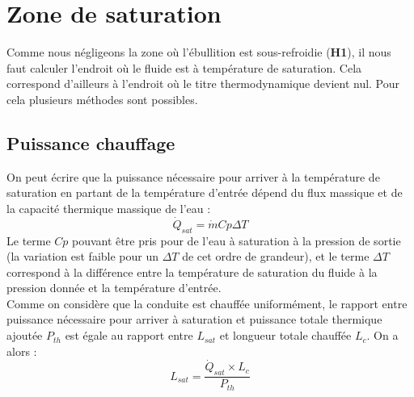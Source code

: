 \section{Zone de saturation\label{section:sat}}
Comme nous négligeons la zone où l'ébullition est sous-refroidie (\textbf{H1}), il nous faut calculer l'endroit où le fluide est à température de saturation. Cela correspond d'ailleurs à l'endroit où le titre thermodynamique devient nul. Pour cela plusieurs méthodes sont possibles.


\subsection{Puissance chauffage}
On peut écrire que la puissance nécessaire pour arriver à la température de saturation en partant de la température d'entrée dépend du flux massique et de la capacité thermique massique de l'eau :
\begin{equation}
    \dot{Q}_{sat} = \dot{m} Cp \Delta T
\end{equation}
Le terme $Cp$ pouvant être pris pour de l'eau à saturation à la pression de sortie (la variation est faible pour un $\Delta T$ de cet ordre de grandeur), et le terme $\Delta T$ correspond à la différence entre la température de saturation du fluide à la pression donnée et la température d'entrée.\\ 
Comme on considère que la conduite est chauffée uniformément, le rapport entre puissance nécessaire pour arriver à saturation et puissance totale thermique ajoutée $P_{th}$ est égale au rapport entre $L_{sat}$ et longueur totale chauffée $L_c$. On a alors :
\begin{equation}
    L_{sat}= \frac{ \dot{Q}_{sat}\times L_c}{P_{th}}
\end{equation}

